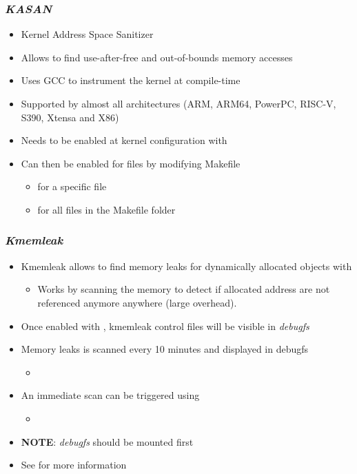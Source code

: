 \begin{frame}
  \frametitle{{\em KASAN}}
  \begin{itemize}
    \item Kernel Address Space Sanitizer
    \item Allows to find use-after-free and out-of-bounds memory accesses
    \item Uses GCC to instrument the kernel at compile-time
    \item Supported by almost all architectures (ARM, ARM64, PowerPC, RISC-V,
          S390, Xtensa and X86)
    \item Needs to be enabled at kernel configuration with
    \item Can then be enabled for files by modifying Makefile
    \begin{itemize}
      \item {} for a specific file
      \item {} for all files in the Makefile folder
    \end{itemize}
  \end{itemize}
\end{frame}

\begin{frame}
  \frametitle{{\em Kmemleak}}
  \begin{itemize}
    \item Kmemleak allows to find memory leaks for dynamically allocated objects
          with 
    \begin{itemize}
      \item Works by scanning the memory to detect if allocated address are not
            referenced anymore anywhere (large overhead).
    \end{itemize}
    \item Once enabled with , kmemleak control
          files will be visible in {\em debugfs}
    \item Memory leaks is scanned every 10 minutes and displayed in debugfs
    \begin{itemize}
      \item {}
    \end{itemize}
    \item An immediate scan can be triggered using 
    \begin{itemize}
      \item {}
    \end{itemize}
    \item {\bf NOTE}: {\em debugfs} should be mounted first
    \item See  for more information
  \end{itemize}
\end{frame}

